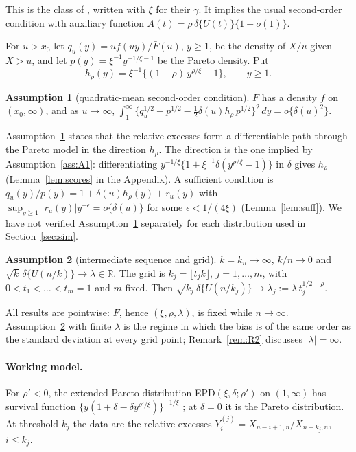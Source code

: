 \documentclass[11pt]{article}
\theoremstyle{definition}
\newtheorem{assumption}{Assumption}
\theoremstyle{remark}
\numberwithin{equation}{section}
\newcommand{\R}{\mathbb{R}}
\begin{document}
This is the class of \citet[Def.~2.2]{bjs2009}, written with $\xi$ for their $\gamma$. It implies the usual second-order condition with auxiliary function $A(t)=\rho\,\delta\{U(t)\}\{1+o(1)\}$.

For $u>x_0$ let $q_u(y)=uf(uy)/\bar F(u)$, $y\ge1$, be the density of $X/u$ given $X>u$, and let $p(y)=\xi^{-1}y^{-1/\xi-1}$ be the Pareto density. Put
\begin{equation}\label{eq:h}
h_\rho(y)=\xi^{-1}\{(1-\rho)\,y^{\rho/\xi}-1\},\qquad y\ge1.
\end{equation}

\begin{assumption}[quadratic-mean second-order condition]\label{ass:A2}
$F$ has a density $f$ on $(x_0,\infty)$, and as $u\to\infty$,
$\int_1^\infty\{q_u^{1/2}-p^{1/2}-\tfrac12\delta(u)h_\rho\,p^{1/2}\}^2\,dy=o\{\delta(u)^2\}$.
\end{assumption}

Assumption~\ref{ass:A2} states that the relative excesses form a differentiable path through the Pareto model in the direction $h_\rho$. The direction is the one implied by Assumption~\ref{ass:A1}: differentiating $y^{-1/\xi}\{1+\xi^{-1}\delta(y^{\rho/\xi}-1)\}$ in $\delta$ gives $h_\rho$ (Lemma~\ref{lem:scores} in the Appendix). A sufficient condition is $q_u(y)/p(y)=1+\delta(u)h_\rho(y)+r_u(y)$ with $\sup_{y\ge1}|r_u(y)|y^{-\epsilon}=o\{\delta(u)\}$ for some $\epsilon<1/(4\xi)$ (Lemma~\ref{lem:suff}). We have not verified Assumption~\ref{ass:A2} separately for each distribution used in Section~\ref{sec:sim}.

\begin{assumption}[intermediate sequence and grid]\label{ass:A3}
$k=k_n\to\infty$, $k/n\to0$ and $\sqrt{k}\,\delta\{U(n/k)\}\to\lambda\in\R$. The grid is $k_j=\lfloor t_jk\rfloor$, $j=1,\dots,m$, with $0<t_1<\dots<t_m=1$ and $m$ fixed. Then $\sqrt{k_j}\,\delta\{U(n/k_j)\}\to\lambda_j:=\lambda\,t_j^{1/2-\rho}$.
\end{assumption}

All results are pointwise: $F$, hence $(\xi,\rho,\lambda)$, is fixed while $n\to\infty$. Assumption~\ref{ass:A3} with finite $\lambda$ is the regime in which the bias is of the same order as the standard deviation at every grid point; Remark~\ref{rem:R2} discusses $|\lambda|=\infty$.

\paragraph{Working model.} For $\rho'<0$, the extended Pareto distribution EPD$(\xi,\delta;\rho')$ on $(1,\infty)$ has survival function $\{y(1+\delta-\delta y^{\rho'/\xi})\}^{-1/\xi}$ \citep[Def.~2.1]{bjs2009}; at $\delta=0$ it is the Pareto distribution. At threshold $k_j$ the data are the relative excesses $Y^{(j)}_i=X_{n-i+1,n}/X_{n-k_j,n}$, $i\le k_j$.
\end{document}
